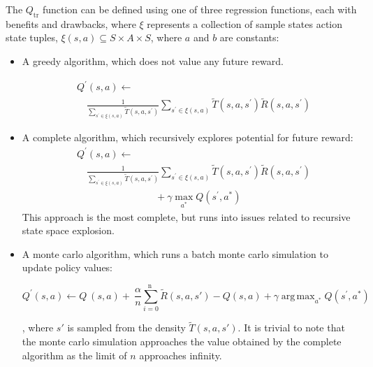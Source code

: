 \documentclass[compsoc,journal,letterpaper,10pt,draftcls,twocolumn]{IEEEtran}
\DeclareMathOperator*{\argmax}{arg\,max}
\begin{document}
The \(Q_{\text{tr}}\) function can be defined using one of three
regression functions, each with benefits and drawbacks, where \(\xi\)
represents a collection of sample states action state tuples,
\(\xi\left( s,a \right) \subseteq S \times A \times S\), where \(a\) and
\(b\) are constants:

\begin{itemize}
\item
  A greedy algorithm, which does not value any future reward.
 

\begin{align}
& Q^{\prime}(s,a) \leftarrow \nonumber \\ 
& \quad
\frac{1}{\displaystyle \sum_{s^\prime  \in\xi(s,a)} \tilde{T}\left( s,a,s^\prime \right)}\sum_{s^\prime\in\xi(s,a)}\tilde{T}\left( s,a,s^\prime \right)\tilde{R}\left( s,a,s^\prime \right)
\end{align} 

 
\item
  A complete algorithm, which recursively explores potential for future
  reward:
\begin{align}
& Q^{\prime}(s,a) \leftarrow \nonumber \\ 
& \quad \frac{1}{\displaystyle \sum_{s^\prime \in \xi(s,a)} \tilde{T}\left( s,a,s^\prime \right)}\sum_{s^\prime\in\xi(s,a)}\tilde{T}\left( s,a,s^\prime \right)\tilde{R}\left( s,a,s^\prime \right) \nonumber \\ & \qquad \qquad \qquad \qquad + \gamma\max_{a^{*}}Q(s^{\prime},a^{*}) 
\end{align}
This approach is the most complete, but runs into issues related to
recursive state space explosion.
 
\item
  A monte carlo algorithm, which runs a batch monte carlo simulation to
  update policy values:
 
\begin{equation}
Q^{'}\left( s,a \right) \leftarrow Q^{\ }\left( s,a \right) + \ \frac{\alpha}{n}\sum_{i = 0}^{\text{n\ }}{\tilde{R}\left( s,a,s' \right) - Q \left( s,a \right) + \gamma\argmax_{a^{*}}{Q(s^{'},a^{*})}}
\end{equation}
 
, where \(s'\) is sampled from the density
\(\tilde{T}\left( s,a,s' \right)\). It is trivial to note that the monte
carlo simulation approaches the value obtained by the complete algorithm
as the limit of \(n\) approaches infinity.
\end{itemize}
\end{document}

